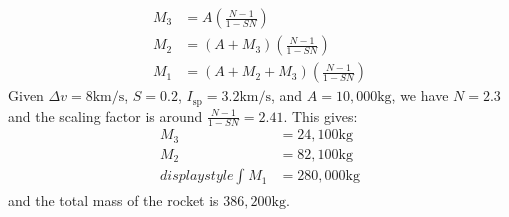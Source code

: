 \begin{itemize}
    \begin{align}
        M_3 &= A\left(\frac{N-1}{1-SN}\right) \\
        M_2 &= (A+M_3)\left(\frac{N-1}{1-SN}\right) \\ 
        M_1 &= (A+M_2+M_3) \left(\frac{N-1}{1-SN}\right) 
    \end{align}
    Given $\Delta v= 8\si{\kilo\meter\per\second}$, $S=0.2$, $I_\text{sp} = 3.2\si{\kilo\meter\per\second}$, and $A=10,000\si{\kilo\gram}$, we have $N=2.3$ and the scaling factor is around $\frac{N-1}{1-SN}=2.41$. This gives:
    \begin{align}
        M_3 &= 24,100 \si{\kilo\gram} \\ 
        M_2 &= 82,100 \si{\kilo\gram} \\displaystyle\int_{}^{}
        M_1 &= 280,000 \si{\kilo\gram}
    \end{align}
    and the total mass of the rocket is $386,200\si{\kilo\gram}$.
\end{itemize}